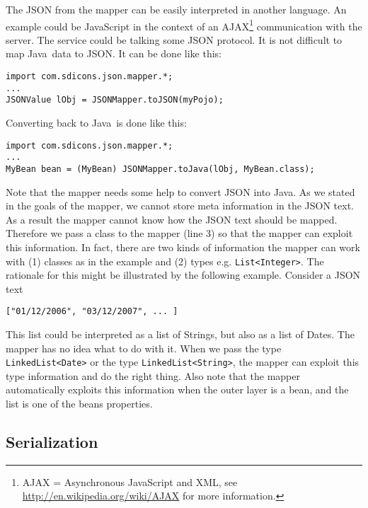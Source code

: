 \documentclass[a4paper]{article}
\newcommand{\java}{Java}
\begin{document}
The JSON from the mapper can be easily interpreted in another language. An example could be JavaScript in the context of an AJAX\footnote{AJAX = Asynchronous JavaScript and XML, see \url{http://en.wikipedia.org/wiki/AJAX} for more information.} communication with the server. The service could be talking some JSON protocol. It is not difficult to map \java\ data to JSON. It can be done like this:

\medskip
\begin{lstlisting}
import com.sdicons.json.mapper.*;
...
JSONValue lObj = JSONMapper.toJSON(myPojo);
\end{lstlisting}
\medskip

Converting back to \java\ is done like this:

\medskip
\begin{lstlisting}
import com.sdicons.json.mapper.*;
...
MyBean bean = (MyBean) JSONMapper.toJava(lObj, MyBean.class);
\end{lstlisting}
\medskip

Note that the mapper needs some help to convert JSON into \java. As we stated in the goals of the mapper, we cannot store meta information in the JSON text. As a result the mapper cannot know how the JSON text should be mapped. Therefore we pass a class to the mapper (line 3) so that the mapper can exploit this information. In fact, there are two kinds of information the mapper can work with (1) classes as in the example and (2) types e.g. \lstinline{List<Integer>}. The rationale for this might be illustrated by the following example. Consider a JSON text 

\medskip
\begin{lstlisting}
["01/12/2006", "03/12/2007", ... ]
\end{lstlisting}
\medskip

This list could be interpreted as a list of Strings, but also as a list of Dates. The mapper has no idea what to do with it. When we pass the type \lstinline{LinkedList<Date>} or the type \lstinline{LinkedList<String>}, the mapper can exploit this type information and do the right thing. Also note that the mapper automatically exploits this information when the outer layer is a bean, and the list is one of the beans properties.

\subsection{Serialization}
\label{serialization}
\end{document}
